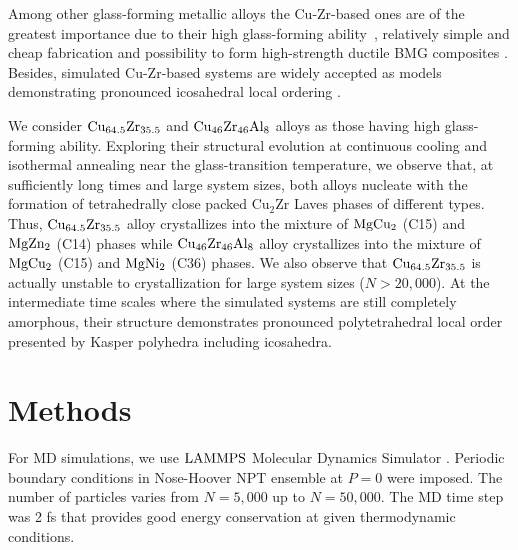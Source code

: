 \documentclass[jcp,twocolumn,superscriptaddress,floatfix,graphicx,showpacs]{revtex4-1}
\begin{document}
Among other glass-forming metallic alloys the Cu-Zr-based ones are of the greatest importance due to their high glass-forming ability~\cite{Xu2004ActMat,Wang2004AppPhysLett,Fan2017Intermet,Zhang2017JNCS}, relatively simple and cheap fabrication and possibility to form  high-strength ductile BMG composites \cite{Wu2011ActaMater,Hofmann2010Science,Rashidi2018MatSciEngA}. Besides, simulated Cu-Zr-based systems are widely accepted as models demonstrating pronounced icosahedral local ordering \cite{Li2009PRB,Cheng2009PRL,Peng2010ApplPhysLett,Soklaski2013PRB,Wu2013PRB,Wen2013JNonCrystSol,Wang2015JPhysChemA,Ryltsev2016JCP}.

We consider ${\rm Cu_{64.5}Zr_{35.5}}$ and ${\rm Cu_{46}Zr_{46}Al_{8}}$ alloys as those having high glass-forming ability. Exploring  their structural evolution at continuous cooling and isothermal annealing near the glass-transition temperature, we observe that, at sufficiently long times and large system sizes, both alloys nucleate with the formation of tetrahedrally close packed $\textrm{Cu}_2\textrm{Zr}$ Laves phases of different types. Thus, ${\rm Cu_{64.5}Zr_{35.5}}$ alloy crystallizes into the mixture of ${\rm Mg Cu_2}$ (C15) and ${\rm Mg Zn_2}$ (C14) phases while ${\rm Cu_{46}Zr_{46}Al_{8}}$ alloy crystallizes into the mixture of ${\rm Mg Cu_2}$ (C15) and ${\rm Mg Ni_2}$ (C36) phases. We also observe that ${\rm Cu_{64.5}Zr_{35.5}}$ is actually unstable to crystallization for large system sizes ($N > 20,000$). At the intermediate time scales where the simulated systems are still completely amorphous, their structure demonstrates pronounced polytetrahedral local order presented by Kasper polyhedra including icosahedra.

\section{Methods}


For MD simulations, we use $\rm{LAMMPS}$ Molecular Dynamics Simulator \cite{Plimpton1995JCompPhys}. Periodic boundary conditions in Nose-Hoover NPT ensemble at $P=0$ were imposed. The number of particles varies from $N=5,000$ up to $N=50,000$.  The MD time step was 2 fs that provides good energy conservation at given thermodynamic conditions.
\end{document}
